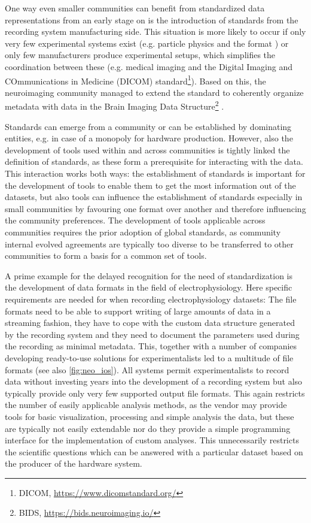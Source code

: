 One way even smaller communities can benefit from standardized data representations from an early stage on is the introduction of standards from the recording system manufacturing side. This situation is more likely to occur if only very few experimental systems exist (e.g. particle physics and the  format \citep{Brun_1996}) or only few manufacturers produce experimental setups, which simplifies the coordination between these (e.g. medical imaging and the Digital Imaging and COmmunications in Medicine (DICOM) standard\footnote{DICOM, \url{https://www.dicomstandard.org/}}). Based on this, the neuroimaging community managed to extend the standard to coherently organize metadata with data in the Brain Imaging Data Structure\footnote{BIDS, \url{https://bids.neuroimaging.io/}} \citep{Gorgolewski_2016}.

Standards can emerge from a community or can be established by dominating entities, e.g. in case of a monopoly for hardware production. However, also the development of tools used within and across communities is tightly linked the definition of standards, as these form a prerequisite for interacting with the data. This interaction works both ways: the establishment of standards is important for the development of tools to enable them to get the most information out of the datasets, but also tools can influence the establishment of standards especially in small communities by favouring one format over another and therefore influencing the community preferences. The development of tools applicable across communities requires the prior adoption of global standards, as community internal evolved agreements are typically too diverse to be transferred to other communities to form a basis for a common set of tools. 

A prime example for the delayed recognition for the need of standardization is the development of data formats in the field of electrophysiology. Here specific requirements are needed for when recording electrophysiology datasets: The file formats need to be able to support writing of large amounts of data in a streaming fashion, they have to cope with the custom data structure generated by the recording system  and they need to document the parameters used during the recording as minimal metadata. This, together with a number of companies developing ready-to-use solutions for experimentalists led to a multitude of file formats (see also \cref{fig:neo_ios}). All systems permit experimentalists to record data without investing years into the development of a recording system but also typically provide only very few supported output file formats. This again restricts the number of easily applicable analysis methods, as the vendor may provide tools for basic visualization, processing and simple analysis the data, but these are typically not easily extendable nor do they provide a simple programming interface for the implementation of custom analyses. This unnecessarily restricts the scientific questions which can be answered with a particular dataset based on the producer of the hardware system.\\

